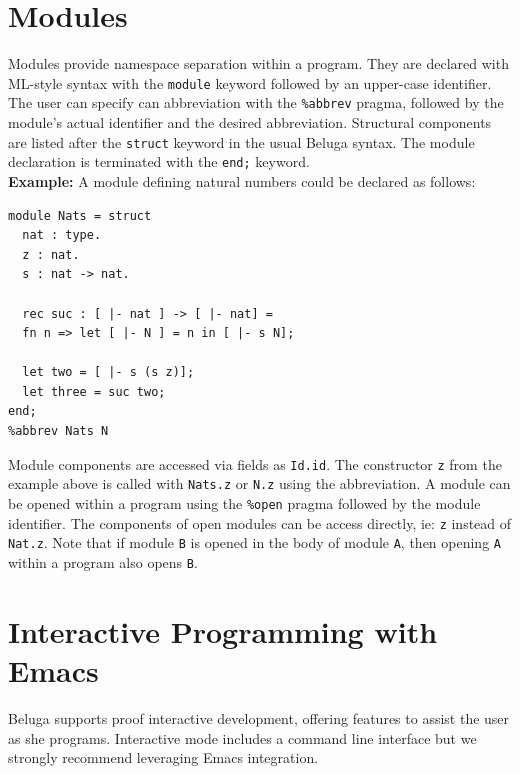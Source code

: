 \documentclass[11pt]{article}
\begin{document}


\section{Modules}
Modules provide namespace separation within a program. They are declared with ML-style syntax with the \texttt{module} keyword followed by an upper-case identifier. The user can specify can abbreviation with the \texttt{\%abbrev} pragma, followed by the module's actual identifier and the desired abbreviation. Structural components are listed after the \texttt{struct} keyword in the usual Beluga syntax. The module declaration is terminated with the \texttt{end;} keyword. \\

\textbf{Example:} A module defining natural numbers could be declared as follows:
\begin{verbatim} 
module Nats = struct  
  nat : type.
  z : nat.
  s : nat -> nat.

  rec suc : [ |- nat ] -> [ |- nat] =
  fn n => let [ |- N ] = n in [ |- s N];

  let two = [ |- s (s z)];
  let three = suc two;
end;
%abbrev Nats N
\end{verbatim}

Module components are accessed via fields as \texttt{Id.id}. The constructor \texttt{z} from the example above is called with \texttt{Nats.z} or \texttt{N.z} using the abbreviation. A module can be opened within a program using the \texttt{\%open} pragma followed by the module identifier. The components of open modules can be access directly, ie: \texttt{z} instead of \texttt{Nat.z}. Note that if module \texttt{B} is opened in the body of module \texttt{A}, then opening \texttt{A} within a program also opens \texttt{B}.


\section{Interactive Programming with Emacs}
Beluga supports proof interactive development, offering features to assist the user as she programs.  Interactive mode includes a command line interface but we strongly recommend leveraging Emacs integration.
\end{document}
